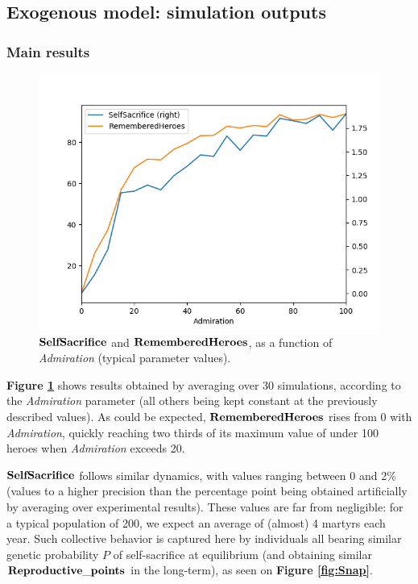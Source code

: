 \documentclass[a4paper,12pt]{article}
\begin{document}
\subsection{Exogenous model: simulation outputs}

\subsubsection{Main results}

\begin{figure}[h]
\centering
\includegraphics[width=1\textwidth]{RGT_10}
\caption{$\bf{SelfSacrifice}$ and $\bf{RememberedHeroes}$, as a function of \emph{Admiration} (typical parameter values).}
\label{fig:RGT_10}
\end{figure}



\textbf{Figure \ref{fig:RGT_10}} shows results obtained by averaging over 30 simulations, according to the \emph{Admiration}
 parameter (all others being kept constant at the previously described values). As could be expected, $\bf{RememberedHeroes}$
 rises from 0 with \emph{Admiration}, quickly reaching two thirds of its maximum value of under 100 heroes when
 \emph{Admiration} exceeds 20. 
 
 $\bf{SelfSacrifice}$ follows similar dynamics, with values ranging between 0 and 2\% (values to a higher precision than
 the percentage point being obtained artificially by averaging over experimental results). These values are far from negligible:
 for a typical population of 200, we expect an average of (almost) 4 martyrs each year.
 Such collective behavior is captured here by individuals all bearing similar genetic probability $P$
 of self-sacrifice at equilibrium (and obtaining similar $\bf{Reproductive\_points}$ in the 
 long-term), as seen on \textbf{Figure \ref{fig:Snap}}. 
 
\end{document}
